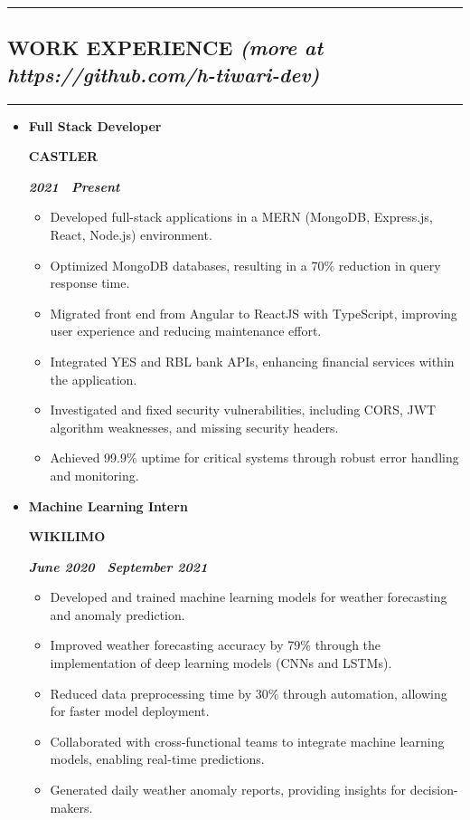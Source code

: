 \documentclass[10pt,letterpaper]{article}
\newcommand{\textbox}[1]{
  \parbox{.333\textwidth}{#1}
}
\newcommand{\sectionTitle}[1]{
  \hrule
  \vspace{-1.0em} 
  \subsection*{\uppercase{\textbf{#1}} }
  \vspace{-0.3em}
    \hrule
    \vspace{0.3em}  
}
\newcommand{\sectionTitleWithWeb}[2]{
  \hrule
  \vspace{-1.0em} 
  \subsection*{\uppercase{\textbf{#1}} \hfill{\small \textit{(more at #2)}}}
  \vspace{-0.em}
  \hrule
  \vspace{0.3em}  
}
\newcommand{\titleExperienceWithoutLocation}[4]{
  \vspace{1.0em}
  \item[]
  {
    \textbox{\textbf{#1}\hfill}\textbox{\hfil \textbf{#2}\hfil}\hfill \textbf{\emph{#3 \textendash \ #4}}
  }
}
\begin{document}
  \sectionTitleWithWeb{Work Experience}{https://github.com/h-tiwari-dev}
  \vspace{-1.1em}
  \begin{itemize}[noitemsep,topsep=0pt]
    
    \titleExperienceWithoutLocation{Full Stack Developer}{CASTLER}{2021}{Present}
    \begin{itemize}[label=\textbullet,noitemsep,topsep=0pt]
      \item Developed full-stack applications in a MERN (MongoDB, Express.js, React, Node.js) environment.
      \item Optimized MongoDB databases, resulting in a 70\% reduction in query response time.
      \item Migrated front end from Angular to ReactJS with TypeScript, improving user experience and reducing maintenance effort.
      \item Integrated YES and RBL bank APIs, enhancing financial services within the application.
      \item Investigated and fixed security vulnerabilities, including CORS, JWT algorithm weaknesses, and missing security headers.
      \item Achieved 99.9\% uptime for critical systems through robust error handling and monitoring.
    \end{itemize}
  
    \titleExperienceWithoutLocation{Machine Learning Intern}{WIKILIMO}{June 2020}{September 2021}
    \begin{itemize}[label=\textbullet,noitemsep,topsep=0pt]
      \item Developed and trained machine learning models for weather forecasting and anomaly prediction.
      \item Improved weather forecasting accuracy by 79\% through the implementation of deep learning models (CNNs and LSTMs).
      \item Reduced data preprocessing time by 30\% through automation, allowing for faster model deployment.
      \item Collaborated with cross-functional teams to integrate machine learning models, enabling real-time predictions.
      \item Generated daily weather anomaly reports, providing insights for decision-makers.
    \end{itemize}
  

\end{itemize}
\end{document}
